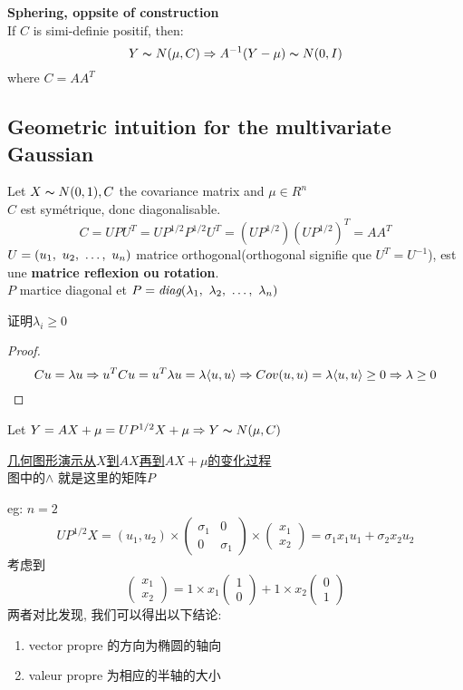 \documentclass{article}
\begin{document}
\begin{fact}
\textbf{Sphering, oppsite of construction}\\
If $C$ is simi-definie positif, then:
$$Y \thicksim{N}(\mu, C) \Rightarrow A^{-1}(Y - \mu) \thicksim{N}(0,I)$$
where $C = A A^T$
\end{fact}

\subsection{Geometric intuition for the multivariate Gaussian}
Let $X \thicksim{N}(0,1), C $ the covariance matrix and $\mu \in R^n$\\
$C$ est sym\'etrique, donc diagonalisable.
$$
C = U P U^T = U P^{1/2} P^{1/2} U^T = (U P^{1/2}) (U P^{1/2})^T =  A A^T
$$
$U = (u_1,~u_2,~\ldots,~u_n)$ matrice orthogonal(orthogonal signifie que $U^T = U^{-1}$), est une \textbf{matrice reflexion ou rotation}.\\
$P$ martice diagonal et $P = \textit{diag}(\lambda_1,~\lambda_2,~\ldots,~\lambda_n)$

证明$\lambda_i \geq 0$
\begin{proof}
$$Cu = \lambda u \Rightarrow u^T C u = u^T \lambda u = \lambda \langle u , u\rangle \Rightarrow Cov(u,u) = \lambda \langle u , u\rangle \geq 0 \Rightarrow \lambda \geq 0$$
\end{proof}

Let $Y = A X + \mu = U P^{1/2} X + \mu \Rightarrow Y \thicksim{N}(\mu, C)$

\href{http://i.imgbox.com/9t3eUww4.png}{几何图形演示从$X$到$AX$再到$AX+\mu$的变化过程}\\
图中的$\wedge$ 就是这里的矩阵$P$

eg: $n = 2$\\
$$
U P^{1/2} X
=
(u_1, u_2)
\times
\begin{pmatrix}
\sigma_1 & 0 \\
0 & \sigma_1
\end{pmatrix}
\times
\begin{pmatrix}
x_1\\
x_2
\end{pmatrix}
=
\sigma_1 x_1 u_1 + \sigma_2 x_2 u_2
$$
考虑到
$$
\begin{pmatrix}
x_1\\
x_2
\end{pmatrix}
=
1 \times x_1
\begin{pmatrix}
1\\
0
\end{pmatrix}
+
1 \times x_2
\begin{pmatrix}
0\\
1
\end{pmatrix}
$$
两者对比发现, 我们可以得出以下结论:
\begin{enumerate}
\item vector propre 的方向为椭圆的轴向
\item valeur propre 为相应的半轴的大小
\end{enumerate}
\end{document}
